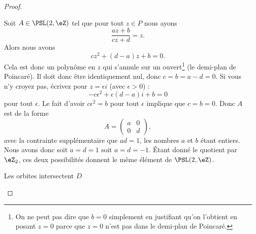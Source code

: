 \begin{proof}
\begin{subproof}
            Soit \( A\in\PSL(2,\eZ)\) tel que pour tout \( z\in P\) nous ayons
            \begin{equation}
                \frac{ az+b }{ cz+d }=z.
            \end{equation}
            Alors nous avons
            \begin{equation}
                cz^2+(d-a)z+b=0.
            \end{equation}
            Cela est donc un polynôme en \( z\) qui s'annule sur un ouvert\footnote{On ne peut pas dire que \( b=0\) simplement en justifiant qu'on l'obtient en posant \( z=0\) parce que \( z=0\) n'est pas dans le demi-plan de Poincaré.} (le demi-plan de Poincaré). Il doit donc être identiquement nul, donc \( c=b=a-d=0\). Si vous n'y croyez pas, écrivez pour \( z=\epsilon i\) (avec \( \epsilon>0\)) :
            \begin{equation}
                -c\epsilon^2+\epsilon(d-a)i+b=0
            \end{equation}
            pour tout \( \epsilon\). Le fait d'avoir \( c\epsilon^2=b\) pour tout \( \epsilon\) implique que \( c=b=0\). Donc \( A\) est de la forme
            \begin{equation}
                A=\begin{pmatrix}
                    a    &   0    \\ 
                    0    &   d    
                \end{pmatrix},
            \end{equation}
            avec la contrainte supplémentaire que \( ad=1\), les nombres \( a\) et \( b\) étant entiers. Nous avons donc soit \( a=d=1\) soit \( a=d=-1\). Étant donné le quotient par \( \eZ_2\), ces deux possibilités donnent le même élément de \( \PSL(2,\eZ)\).
            

        \item[Les orbites intersectent \( D\)] 


\end{subproof}
\end{proof}
